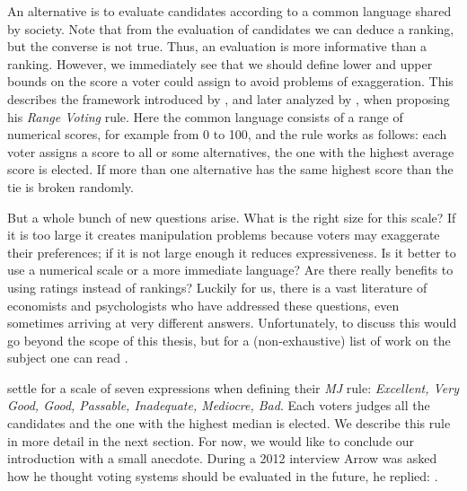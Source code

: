 An alternative is to evaluate candidates according to a common language shared by society. Note that from the evaluation of candidates we can deduce a ranking, but the converse is not true. Thus, an evaluation is more informative than a ranking.
However, we immediately see that we should define lower and upper bounds on the score a voter could assign to avoid problems of exaggeration.
This describes the framework introduced by \citet{Smith2000}, and later analyzed by \citet{Pivato2014,Gaertner2012,Zahid2015}, when proposing his \textit{Range Voting} rule.
Here the common language consists of a range of numerical scores, for example from 0 to 100, and the rule works as follows: each voter assigns a score to all or some alternatives, the one with the highest average score is elected. If more than one alternative has the same highest score than the tie is broken randomly.

But a whole bunch of new questions arise. What is the right size for this scale? If it is too large it creates manipulation problems because voters may exaggerate their preferences; if it is not large enough it reduces expressiveness. Is it better to use a numerical scale or a more immediate language? Are there really benefits to using ratings instead of rankings? 
Luckily for us, there is a vast literature of economists and psychologists who have addressed these questions, even sometimes arriving at very different answers. Unfortunately, to discuss this would go beyond the scope of this thesis, but for a (non-exhaustive) list of work on the subject one can read \citet{Cox1980,Sparling2011,Churchill1984,Preston2000,Maio1996}.

\citet{Balinski2007} settle for a scale of seven expressions when defining their \textit{\acl{MJ}} rule: \textit{Excellent, Very Good, Good, Passable, Inadequate, Mediocre, Bad}. Each voters judges all the candidates and the one with the highest median is elected. We describe this rule in more detail in the next section.
For now, we would like to conclude our introduction with a small anecdote. During a 2012 interview Arrow was asked how he thought voting systems should be evaluated in the future, he replied:  \citep{PodcastArrow}.


